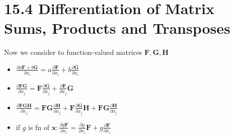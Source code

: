 \documentclass[a4paper]{article}
\newcommand{\mb}{\mathbf}
\begin{document}
\section*{15.4 Differentiation of Matrix Sums, Products and Transposes}
Now we consider to function-valued matrices $\mb{F,G,H}$
\begin{itemize}
\item $\frac{\partial a\mb{F}+b\mb{G}}{\partial x_i} = a\frac{\partial \mb{F}}{\partial x_i}+b\frac{\partial \mb{G}}{\partial x_i}$
\item $\frac{\partial \mb{FG}}{\partial x_j} = \mb{F}\frac{\partial \mb{G}}{\partial x_j}+\frac{\partial \mb{F}}{\partial x_j}\mb{G}$
\item $\frac{\partial \mb{FGH}}{\partial x_j} = \mb{FG}\frac{\partial \mb{H}}{\partial x_j}+\mb{F}\frac{\partial \mb{G}}{\partial x_j}\mb{H}+\mb{FG}\frac{\partial \mb{H}}{\partial x_j}$
\item if $g$ is fn of $\mathbf{x}: \frac{\partial g\mb{F}}{\partial x_i} = \frac{\partial g}{\partial x_i}\mb{F}+g\frac{\partial \mb{F}}{\partial x_i}$
\end{itemize}
\end{document}
